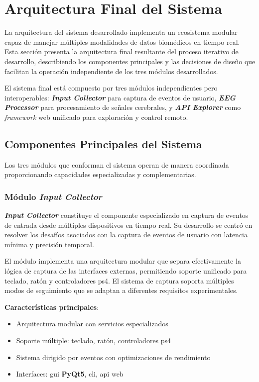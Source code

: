 \section{Arquitectura Final del Sistema}
\label{sec:arquitectura_final_sistema}

La arquitectura del sistema desarrollado implementa un ecosistema modular capaz de manejar múltiples modalidades de datos biomédicos en tiempo real. Esta sección presenta la arquitectura final resultante del proceso iterativo de desarrollo, describiendo los componentes principales y las decisiones de diseño que facilitan la operación independiente de los tres módulos desarrollados.

El sistema final está compuesto por tres módulos independientes pero interoperables: \textbf{\textit{Input Collector}} para captura de eventos de usuario, \textbf{\textit{EEG Processor}} para procesamiento de señales cerebrales, y \textbf{\textit{API Explorer}} como \textit{\gls{framework}} web unificado para exploración y control remoto.

\subsection{Componentes Principales del Sistema}
\label{subsec:componentes_principales_sistema}

Los tres módulos que conforman el sistema operan de manera coordinada proporcionando capacidades especializadas y complementarias.

\subsubsection{Módulo \textit{Input Collector}}
\label{subsubsec:modulo_input_collector}

\textit{\textbf{Input Collector}} constituye el componente especializado en captura de eventos de entrada desde múltiples dispositivos en tiempo real. Su desarrollo se centró en resolver los desafíos asociados con la captura de eventos de usuario con latencia mínima y precisión temporal.

El módulo implementa una arquitectura modular que separa efectivamente la lógica de captura de las interfaces externas, permitiendo soporte unificado para teclado, ratón y controladores \acrshort{ps4}. El sistema de captura soporta múltiples modos de seguimiento que se adaptan a diferentes requisitos experimentales.

\textbf{Características principales}:
\begin{itemize}
    \item Arquitectura modular con servicios especializados
    \item Soporte múltiple: teclado, ratón, controladores \acrshort{ps4}
    \item Sistema dirigido por eventos con optimizaciones de rendimiento
    \item Interfaces: \acrshort{gui} \textbf{PyQt5}, \acrshort{cli}, \acrshort{api} web
\end{itemize}


